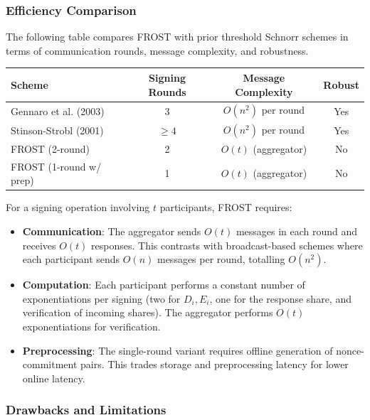 \subsubsection{Efficiency Comparison}

The following table compares FROST with prior threshold Schnorr schemes in terms of communication rounds, message complexity, and robustness.

\begin{center}
\begin{tabular}{|l|c|c|c|}
\hline
\textbf{Scheme} & \textbf{Signing Rounds} & \textbf{Message Complexity} & \textbf{Robust} \\
\hline
Gennaro et al. (2003) & 3 & \(O(n^2)\) per round & Yes \\
Stinson-Strobl (2001) & \(\ge 4\) & \(O(n^2)\) per round & Yes \\
FROST (2-round) & 2 & \(O(t)\) (aggregator) & No \\
FROST (1-round w/ prep) & 1 & \(O(t)\) (aggregator) & No \\
\hline
\end{tabular}
\end{center}

For a signing operation involving \(t\) participants, FROST requires:
\begin{itemize}
    \item \textbf{Communication}: The aggregator sends \(O(t)\) messages in each round and receives \(O(t)\) responses. This contrasts with broadcast-based schemes where each participant sends \(O(n)\) messages per round, totalling \(O(n^2)\).
    \item \textbf{Computation}: Each participant performs a constant number of exponentiations per signing (two for \(D_i,E_i\), one for the response share, and verification of incoming shares). The aggregator performs \(O(t)\) exponentiations for verification.
    \item \textbf{Preprocessing}: The single-round variant requires offline generation of nonce-commitment pairs. This trades storage and preprocessing latency for lower online latency.
\end{itemize}

\subsubsection{Drawbacks and Limitations}


